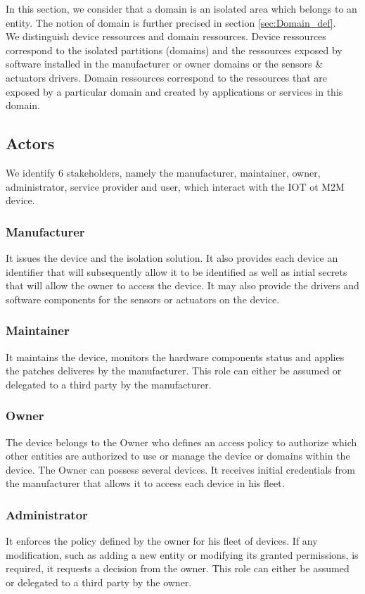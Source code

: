 \documentclass[conference]{IEEEtran}
\begin{document}
In this section, we consider that a domain is an isolated area which belongs to an entity. The notion of domain is further precised in section \ref{sec:Domain_def}.\\

We distinguish device ressources and domain ressources. Device ressources correspond to the isolated partitions (domains) and the ressources exposed by software installed in the manufacturer or owner domains or the sensors \& actuators drivers. Domain ressources correspond to the ressources that are exposed by a particular domain and created by applications or services in this domain.\\

\subsection{Actors}
\label{sec:Actors}
We identify 6 stakeholders, namely the manufacturer, maintainer, owner, administrator, service provider and user, which interact with the IOT ot M2M device.
\subsubsection{Manufacturer}
It issues the device and the isolation solution. It also provides each device an identifier that will subsequently allow it to be identified as well as intial secrets that will allow the owner to access the device. It may also provide the drivers and software components for the sensors or actuators on the device. 
\subsubsection{Maintainer}
It maintains the device, monitors the hardware components status and applies the patches deliveres by the manufacturer. This role can either be assumed or delegated to a third party by the manufacturer. 
\subsubsection{Owner}
The device belongs to the Owner who defines an access policy to authorize which other entities are authorized to use or manage the device or domains within the device. The Owner can possess several devices. It receives initial credentials from the manufacturer that allows it to access each device in his fleet. 
\subsubsection{Administrator}
It enforces the policy defined by the owner for his fleet of devices. If any modification, such as adding a new entity or modifying its granted permissions,  is required, it requests a decision from the owner. This role can either be assumed or delegated to a third party by the owner. 
\end{document}
